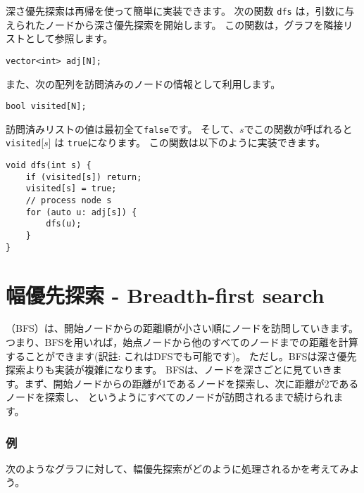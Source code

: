 深さ優先探索は再帰を使って簡単に実装できます。
次の関数  \texttt{dfs}  は，引数に与えられたノードから深さ優先探索を開始します。
この関数は，グラフを隣接リストとして参照します。
\begin{lstlisting}
vector<int> adj[N];
\end{lstlisting}
また、次の配列を訪問済みのノードの情報として利用します。
\begin{lstlisting}
bool visited[N];
\end{lstlisting}
訪問済みリストの値は最初全て\texttt{false}です。
そして、$s$でこの関数が呼ばれると\texttt{visited}[$s$] は \texttt{true}になります。
この関数は以下のように実装できます。
\begin{lstlisting}
void dfs(int s) {
    if (visited[s]) return;
    visited[s] = true;
    // process node s
    for (auto u: adj[s]) {
        dfs(u);
    }
}
\end{lstlisting}

\section{幅優先探索 - Breadth-first search}


 （BFS）は、開始ノードからの距離順が小さい順にノードを訪問していきます。
つまり、BFSを用いれば，始点ノードから他のすべてのノードまでの距離を計算することができます(訳註: これはDFSでも可能です)。
ただし。BFSは深さ優先探索よりも実装が複雑になります。
BFSは、ノードを深さごとに見ていきます。まず、開始ノードからの距離が1であるノードを探索し、次に距離が2であるノードを探索し、
というようにすべてのノードが訪問されるまで続けられます。

\subsubsection*{例}
次のようなグラフに対して、幅優先探索がどのように処理されるかを考えてみよう。

\begin{center}
\end{center}

